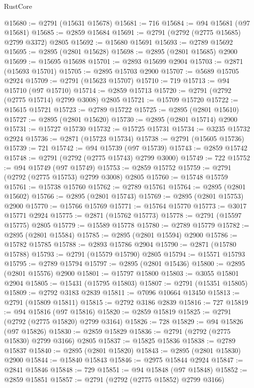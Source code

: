 \begin{lexlean}{RustCore}
\begin{coremodule}
@15680 := @2791 (@15631 @15678)
@15681 := 716
@15684 := @94 @15681 (@97 @15681)
@15685 := @2859 @15684
@15691 := @2791 (@2792 (@2775 @15685) @2799 @3372) @2805
@15692 := @15680 @15691
@15693 := @2789 @15692
@15695 := @2895 (@2801 @15628)
@15698 := @2895 (@2801 @15685) @2900
@15699 := @15695 @15698
@15701 := @2893 @15699 @2904
@15703 := @2871 (@15693 @15701)
@15705 := @2895 @15703 @2900
@15707 := @5689 @15705 @2924
@15709 := @2791 (@15623 @15707)
@15710 := 719
@15713 := @94 @15710 (@97 @15710)
@15714 := @2859 @15713
@15720 := @2791 (@2792 (@2775 @15714) @2799 @3008) @2805
@15721 := @15709 @15720
@15722 := @15615 @15721
@15723 := @2789 @15722
@15725 := @2895 (@2801 @15610)
@15727 := @2895 (@2801 @15620)
@15730 := @2895 (@2801 @15714) @2900
@15731 := @15727 @15730
@15732 := @15725 @15731
@15734 := @3235 @15732 @2924
@15736 := @2871 (@15723 @15734)
@15738 := @2791 (@15605 @15736)
@15739 := 721
@15742 := @94 @15739 (@97 @15739)
@15743 := @2859 @15742
@15748 := @2791 (@2792 (@2775 @15743) @2799 @3000)
@15749 := 722
@15752 := @94 @15749 (@97 @15749)
@15753 := @2859 @15752
@15759 := @2791 (@2792 (@2775 @15753) @2799 @3008) @2805
@15760 := @15748 @15759
@15761 := @15738 @15760
@15762 := @2789 @15761
@15764 := @2895 (@2801 @15602)
@15766 := @2895 (@2801 @15743)
@15769 := @2895 (@2801 @15753) @2900
@15770 := @15766 @15769
@15771 := @15764 @15770
@15773 := @3017 @15771 @2924
@15775 := @2871 (@15762 @15773)
@15778 := @2791 (@15597 @15775) @2805
@15779 := @15589 @15778
@15780 := @2789 @15779
@15782 := @2895 (@2801 @15584)
@15785 := @2895 (@2801 @15594) @2900
@15786 := @15782 @15785
@15788 := @2893 @15786 @2904
@15790 := @2871 (@15780 @15788)
@15793 := @2791 (@15579 @15790) @2805
@15794 := @15571 @15793
@15795 := @2789 @15794
@15797 := @2895 (@2801 @15436)
@15800 := @2895 (@2801 @15576) @2900
@15801 := @15797 @15800
@15803 := @3055 @15801 @2904
@15805 := @15431 (@15795 @15803)
@15807 := @2791 (@15351 @15805)
@15809 := @2792 @3183 @2839
@15811 := @7096 @10664 @13450
@15813 := @2791 (@15809 @15811)
@15815 := @2792 @3186 @2839
@15816 := 727
@15819 := @94 @15816 (@97 @15816)
@15820 := @2859 @15819
@15825 := @2791 (@2792 (@2775 @15820) @2799 @3164)
@15826 := 728
@15829 := @94 @15826 (@97 @15826)
@15830 := @2859 @15829
@15836 := @2791 (@2792 (@2775 @15830) @2799 @3166) @2805
@15837 := @15825 @15836
@15838 := @2789 @15837
@15840 := @2895 (@2801 @15820)
@15843 := @2895 (@2801 @15830) @2900
@15844 := @15840 @15843
@15846 := @2975 @15844 @2924
@15847 := @2841 @15846
@15848 := 729
@15851 := @94 @15848 (@97 @15848)
@15852 := @2859 @15851
@15857 := @2791 (@2792 (@2775 @15852) @2799 @3166)

\end{coremodule}
\end{lexlean}
